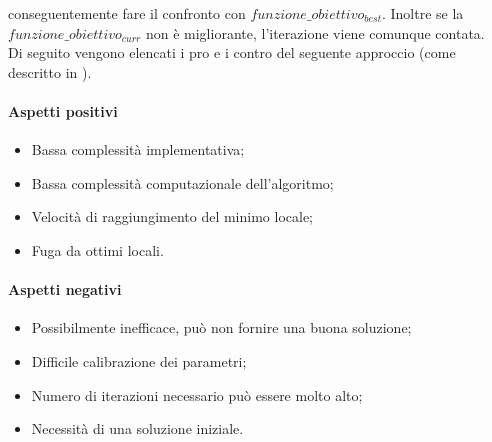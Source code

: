 conseguentemente fare il confronto con {$funzione\_obiettivo_{best}$}. Inoltre se la {$funzione\_obiettivo_{curr}$} non è migliorante, l'iterazione
viene comunque contata.\\
Di seguito vengono elencati i pro e i contro del seguente approccio (come descritto in \cite{site:paper-lo-go} \cite{site:articolo-tabu-search}).\\
\noindent \paragraph{Aspetti positivi}
\begin{itemize}
    \item Bassa complessità implementativa;
    \item Bassa complessità computazionale dell'algoritmo;
    \item Velocità di raggiungimento del minimo locale;
    \item Fuga da ottimi locali.
\end{itemize}

\noindent \paragraph{Aspetti negativi}
\begin{itemize}
    \item Possibilmente inefficace, può non fornire una buona soluzione;
    \item Difficile calibrazione dei parametri;
    \item Numero di iterazioni necessario può essere molto alto;
    \item Necessità di una soluzione iniziale.
\end{itemize}
